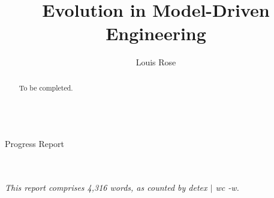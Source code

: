 \documentclass[a4paper,10pt]{article}
\title{Evolution in Model-Driven Engineering}
\author{Louis Rose}
\makeatletter
\renewcommand{\maketitle}{
  \begin{titlepage}
    \center
    \vspace*{\stretch{1}}
    \textsf{\huge \bfseries\sf \@title}\\
    \bigskip
    {\LARGE Progress Report}\\
    \vspace*{\stretch{1}}
    {\Large \@author}\\
    \bigskip
    {\Large \@date}\\
    \vspace*{\stretch{2}}
  \end{titlepage}
}
\makeatother
\begin{document}

\maketitle

\begin{abstract}
To be completed.
\end{abstract}

\vspace{2mm}

\begin{center}
  \small{\textit{This report comprises 4,316 words, as counted by detex $|$ wc -w.}}
\end{center}

\newpage
\tableofcontents
\newpage








\end{document}
